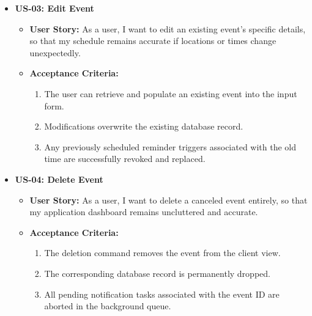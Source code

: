 \begin{itemize}
    \item \textbf{US-03: Edit Event}
          \begin{itemize}
              \item \textbf{User Story:} As a user, I want to edit an existing event's specific details, so that my schedule remains accurate if locations or times change unexpectedly.
              \item \textbf{Acceptance Criteria:}
                    \begin{enumerate}
                        \item The user can retrieve and populate an existing event into the input form.
                        \item Modifications overwrite the existing database record.
                        \item Any previously scheduled reminder triggers associated with the old time are successfully revoked and replaced.
                    \end{enumerate}
          \end{itemize}

    \item \textbf{US-04: Delete Event}
          \begin{itemize}
              \item \textbf{User Story:} As a user, I want to delete a canceled event entirely, so that my application dashboard remains uncluttered and accurate.
              \item \textbf{Acceptance Criteria:}
                    \begin{enumerate}
                        \item The deletion command removes the event from the client view.
                        \item The corresponding database record is permanently dropped.
                        \item All pending notification tasks associated with the event ID are aborted in the background queue.
                    \end{enumerate}
          \end{itemize}


\end{itemize}
